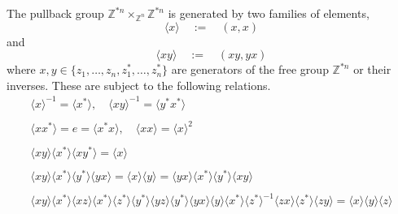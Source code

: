 \documentclass{amsbook} %
\numberwithin{section}{chapter}
\begin{document}
\begin{prop} \label{pushpres} The pullback group $\mathbb{Z}^{\ast n} \times_{\mathbb{Z}^n} \mathbb{Z}^{\ast n}$ is generated by two families of elements,
  \[
    \langle x \rangle \quad := \quad (x, x)
  \]
and
  \[
    \langle xy \rangle \quad := \quad (xy, yx)
  \]
where $x,y \in \{z_1, \ldots, z_n, z_1^*, \ldots, z_n^*\}$ are generators of the free group $\mathbb{Z}^{\ast n}$ or their inverses. These are subject to the following relations.
  \[
    \begin{array}{c}
			\langle x \rangle^{-1}  =  \langle x^* \rangle,  \quad  \langle xy \rangle^{-1}  =  \langle y^*x^* \rangle \\
			\\
			\langle xx^* \rangle  =  e  =  \langle x^*x \rangle,  \quad  \langle xx \rangle  =  \langle x \rangle^2 \\
			\\
			\langle xy \rangle \langle x^* \rangle \langle xy^* \rangle  =  \langle x \rangle \\
			\\
			\langle xy \rangle \langle x^* \rangle \langle y^* \rangle \langle yx \rangle  =  \langle x \rangle \langle y \rangle   =  \langle yx \rangle \langle x^* \rangle \langle y^* \rangle \langle xy \rangle \\
			\\
			\langle xy \rangle \langle x^* \rangle \langle xz \rangle \langle x^* \rangle \langle z^* \rangle \langle y^* \rangle \langle yz \rangle \langle y^* \rangle \langle yx \rangle \langle y \rangle \langle x^* \rangle \langle z^* \rangle^{-1} \langle zx \rangle \langle z^* \rangle \langle zy \rangle  =  \langle x \rangle\langle y \rangle\langle z \rangle 
  	\end{array}
  \]
\end{prop}
\end{document}
